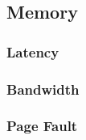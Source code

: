 \documentclass[paper=letter]{article}
\begin{document}
\newpage

\subsection{Memory}

\subsubsection{Latency}

\newpage

\subsubsection{Bandwidth}

\newpage

\subsubsection{Page Fault}

\newpage

\printbibliography
\end{document}
